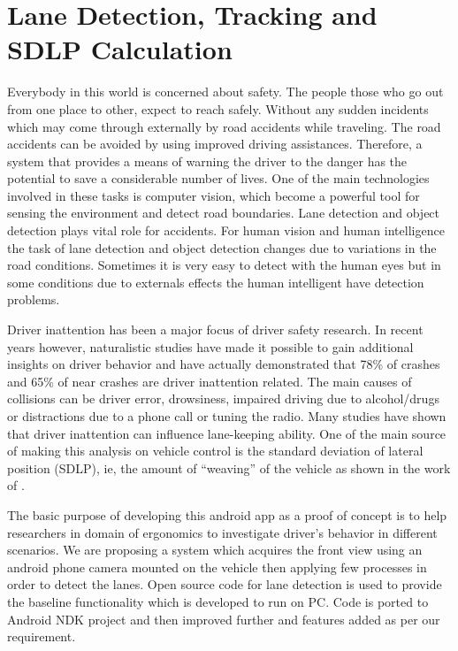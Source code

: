 \chapter{Lane Detection, Tracking and SDLP Calculation}  \label{kap:sdlp}


Everybody in this world is concerned about safety. The people those who go out
from one place to other, expect to reach safely. Without any sudden incidents
which may come through externally by road accidents while traveling. The road
accidents can be avoided by using improved driving assistances. Therefore, a
system that provides a means of warning the driver to the danger has the
potential to save a considerable number of lives. One of the main technologies
involved in these tasks is computer vision, which become a powerful tool for
sensing the environment and detect road boundaries. Lane detection and object
detection plays vital role for accidents. For human vision and human
intelligence the task of lane detection and object detection changes due to
variations in the road conditions. Sometimes it is very easy to detect with the
human eyes but in some conditions due to externals effects the human intelligent
have detection problems. 


Driver inattention has been a major focus of driver safety research. In recent years however,
naturalistic studies have made it possible to gain additional insights on driver
behavior and have actually demonstrated that 78\% of crashes and 65\% of near
crashes are driver inattention related. The main causes of
collisions can be driver error, drowsiness, impaired driving due to
alcohol/drugs or distractions due to a phone call or tuning the radio. Many
studies have shown that driver inattention can influence lane-keeping ability.
One of the main source of making this analysis on vehicle control is the
standard deviation of lateral position (SDLP), ie, the amount of ``weaving'' of
the vehicle as shown in the work of \cite{lane6}.


The basic purpose of developing this android app as a proof of concept is to
help researchers in domain of ergonomics to investigate driver's behavior in
different scenarios. We are proposing a system which acquires the front view
using an android phone camera mounted on the vehicle then applying few processes
in order to detect the lanes. Open source code for lane detection
\cite{lane-code} is used to provide the baseline functionality which is developed 
to run on PC\@. Code is ported to Android NDK project and then improved 
further and features added as per our requirement.


